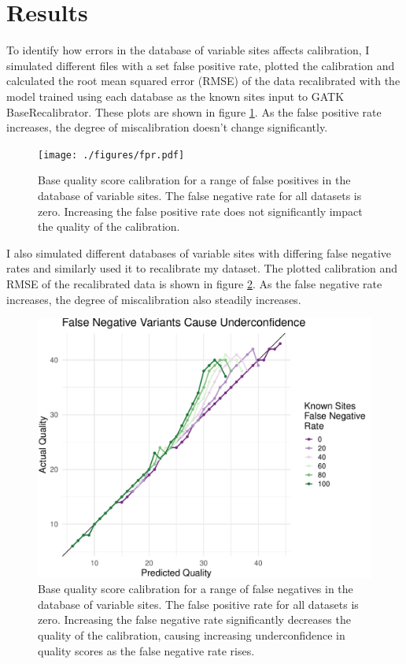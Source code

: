 \documentclass{article}
\begin{document}
\section{Results}
\begin{outline}
	\item To identify how errors in the database of variable sites affects calibration, I simulated different files with a set false positive rate, plotted the calibration and calculated the root mean squared error (RMSE) of the data recalibrated with the model trained using each database as the known sites input to GATK BaseRecalibrator. These plots are shown in figure \ref{figure:fpr}. As the false positive rate increases, the degree of miscalibration doesn't change significantly. 
\end{outline}

\begin{figure}
	\texttt{[image: ./figures/fpr.pdf]}
	\caption{Base quality score calibration for a range of false positives in the database of variable sites. The false negative rate for all datasets is zero. Increasing the false positive rate does not significantly impact the quality of the calibration.}
	\label{figure:fpr}
\end{figure}

\begin{outline}
	\item I also simulated different databases of variable sites with differing false negative rates and similarly used it to recalibrate my dataset. The plotted calibration and RMSE of the recalibrated data is shown in figure \ref{figure:fnr}. As the false negative rate increases, the degree of miscalibration also steadily increases.
\end{outline}

\begin{figure}
	\includegraphics[width=.6\textwidth]{./figures/fnr.pdf}
	\caption{Base quality score calibration for a range of false negatives in the database of variable sites. The false positive rate for all datasets is zero. Increasing the false negative rate significantly decreases the quality of the calibration, causing increasing  underconfidence in quality scores as the false negative rate rises.}
	\label{figure:fnr}
\end{figure}
\end{document}
